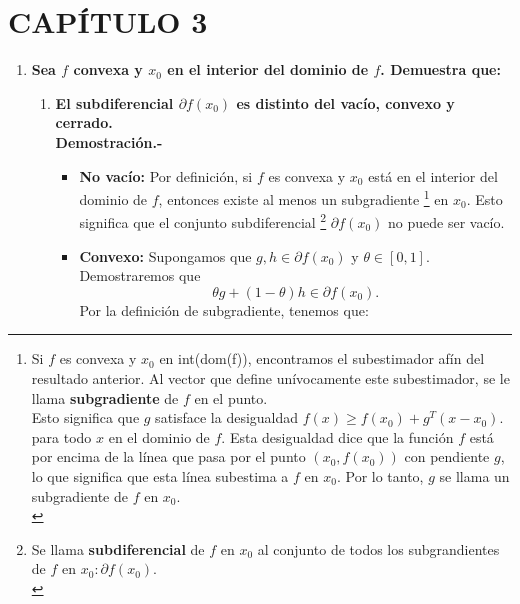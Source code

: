 \pagebreak

\section*{CAPÍTULO 3}

\begin{enumerate}

    \item \textbf{\boldmath Sea $f$ convexa y $x_0$ en el interior del dominio de $f$. Demuestra que:}
	\begin{enumerate}[\bfseries (a)]
	    \item \textbf{\boldmath El subdiferencial $\partial f(x_0)$ es distinto del vacío, convexo y cerrado.}\\

		\textbf{Demostración.-}\; 

		\begin{itemize}

		    \item \textbf{No vacío:} Por definición, si $f$ es convexa y $x_0$ está en el interior del dominio de $f$, entonces existe al menos un subgradiente
		    \footnote{
			Si $f$ es convexa y $x_0$ en int(dom(f)), encontramos el subestimador afín del resultado anterior. Al vector que define unívocamente este subestimador, se le llama \textbf{subgradiente} de $f$ en el punto.\\
			Esto significa que $g$ satisface la desigualdad $f(x) \geq f(x_0) + g^T (x-x_0).$ para todo $x$ en el dominio de $f$. Esta desigualdad dice que la función $f$ está por encima de la línea que pasa por el punto $(x_0, f(x_0))$ con pendiente $g$, lo que significa que esta línea subestima a $f$ en $x_0$. Por lo tanto, $g$ se llama un subgradiente de $f$ en $x_0$.\\
		    \label{subgradiente}}
			en $x_0$. Esto significa que el conjunto subdiferencial
		    \footnote{	
			Se llama \textbf{subdiferencial} de $f$ en $x_0$ al conjunto de todos los subgrandientes de $f$ en $x_0: \partial f(x_0)$.\\
		    \label{subdiferencial}}
			$\partial f(x_0)$ no puede ser vacío.\\

		    \item \textbf{Convexo:} Supongamos que $g,h \in \partial f(x_0)$ y $\theta \in [0,1]$. Demostraremos que 
			$$\theta g + (1-\theta)h \in \partial f(x_0).$$
			Por la definición de subgradiente, tenemos que:


\end{itemize}
\end{enumerate}
\end{enumerate}
